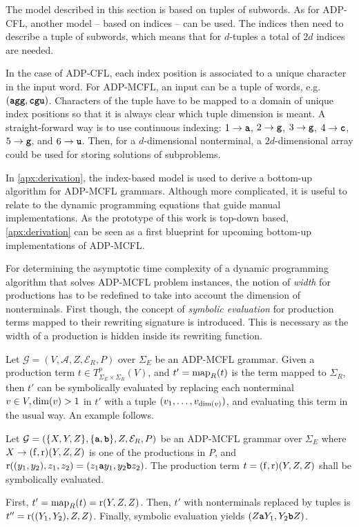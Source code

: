 \documentclass[
    a4paper,
    12pt,
    twoside,
    BCOR=12mm,
    parskip=half,
    chapterprefix,
    numbers=noenddot,
    bibliography=totoc
]{scrbook}
\begin{document}
\begin{remark}
	The model described in this section is based on tuples of subwords. As for ADP-CFL, another model -- based on indices -- can be used. The indices then need to describe a tuple of subwords, which means that for $d$-tuples a total of $2d$ indices are needed.

	In the case of ADP-CFL, each index position is associated to a unique character in the input word. For ADP-MCFL, an input can be a tuple of words, e.g. $(\ts{agg},\ts{cgu})$. Characters of the tuple have to be mapped to a domain of unique index positions so that it is always clear which tuple dimension is meant. A straight-forward way is to use continuous indexing: $1 \to \ts{a}$, $2 \to \ts{g}$, $3 \to \ts{g}$, $4 \to \ts{c}$, $5 \to \ts{g}$, and $6 \to \ts{u}$. Then, for a $d$-dimensional nonterminal, a $2d$-dimensional array could be used for storing solutions of subproblems.
  
  In \cref{apx:derivation}, the index-based model is used to derive a bottom-up algorithm for ADP-MCFL grammars. Although more complicated, it is useful to relate to the dynamic programming equations that guide manual implementations. As the prototype of this work is top-down based, \cref{apx:derivation} can be seen as a first blueprint for upcoming bottom-up implementations of ADP-MCFL.
\end{remark}

For determining the asymptotic time complexity of a dynamic programming algorithm that solves ADP-MCFL problem instances, the notion of \emph{width} for productions has to be redefined to take into account the dimension of nonterminals. First though, the concept of \emph{symbolic evaluation} for production terms mapped to their rewriting signature is introduced. This is necessary as the width of a production is hidden inside its rewriting function. 

Let $\mathcal{G}=(V,\mathcal{A},Z,\mathcal{E}_R,P)$ over $\Sigma_E$ be an ADP-MCFL grammar. Given a production term $t \in T^p_{\Sigma_E \times \Sigma_R}(V)$, and $t' = \mathrm{map}_R(t)$ is the term mapped to $\Sigma_R$, then $t'$ can be symbolically evaluated by replacing each nonterminal $v \in V, \mathrm{dim}(v)>1$ in $t'$ with a tuple $(v_1,\ldots,v_{\mathrm{dim}(v)})$, and evaluating this term in the usual way. An example follows.

\begin{example}
	Let $\mathcal{G}=(\{X,Y,Z\},\{\ts{a},\ts{b}\},Z,\mathcal{E}_R,P)$ be an ADP-MCFL grammar over $\Sigma_E$ where $X \to (\mathrm{f},\mathrm{r})(Y,Z,Z)$ is one of the productions in $P$, and $\op{r}((y_1,y_2),z_1,z_2)=(z_1 \ts{a} y_1, y_2 \ts{b} z_2)$. The production term $t=(\mathrm{f},\mathrm{r})(Y,Z,Z)$ shall be symbolically evaluated.
	
	First, $t' = \mathrm{map}_R(t)=\mathrm{r}(Y,Z,Z)$. Then, $t'$ with nonterminals replaced by tuples is $t''=\mathrm{r}((Y_1,Y_2),Z,Z)$. Finally, symbolic evaluation yields $(Z\ts{a}Y_1,Y_2\ts{b}Z)$.
\end{example}
\end{document}
